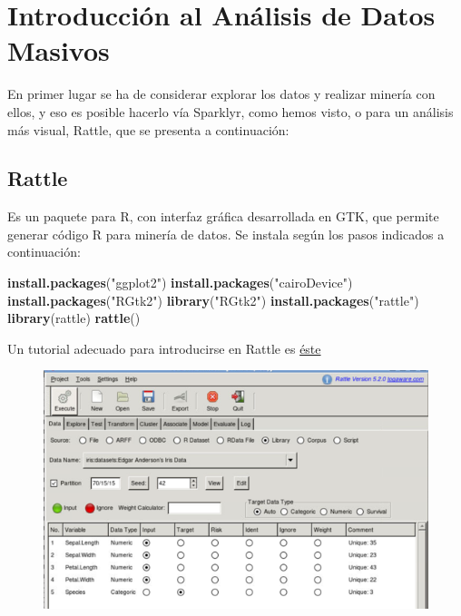 \documentclass[]{book}
\newenvironment{Shaded}{\begin{snugshade}}{\end{snugshade}}
\newcommand{\KeywordTok}[1]{\textcolor[rgb]{0.13,0.29,0.53}{\textbf{#1}}}
\newcommand{\StringTok}[1]{\textcolor[rgb]{0.31,0.60,0.02}{#1}}
\newcommand{\NormalTok}[1]{#1}
\begin{document}
\section{Introducción al Análisis de Datos
Masivos}\label{introduccion-al-analisis-de-datos-masivos}

En primer lugar se ha de considerar explorar los datos y realizar
minería con ellos, y eso es posible hacerlo vía Sparklyr, como hemos
visto, o para un análisis más visual, Rattle, que se presenta a
continuación:

\subsection{Rattle}\label{rattle}

Es un paquete para R, con interfaz gráfica desarrollada en GTK, que
permite generar código R para minería de datos. Se instala según los
pasos indicados a continuación:

\begin{Shaded}
\begin{Highlighting}[]
\KeywordTok{install.packages}\NormalTok{(}\StringTok{"ggplot2"}\NormalTok{)}
\KeywordTok{install.packages}\NormalTok{(}\StringTok{"cairoDevice"}\NormalTok{)}
\KeywordTok{install.packages}\NormalTok{(}\StringTok{"RGtk2"}\NormalTok{)}
\KeywordTok{library}\NormalTok{(}\StringTok{"RGtk2"}\NormalTok{)}
\KeywordTok{install.packages}\NormalTok{(}\StringTok{"rattle"}\NormalTok{)}
\KeywordTok{library}\NormalTok{(rattle)}
\KeywordTok{rattle}\NormalTok{()}
\end{Highlighting}
\end{Shaded}

Un tutorial adecuado para introducirse en Rattle es
\href{https://www.dummies.com/programming/using-rattle-iris-r-programming/}{éste}

\begin{figure}
\centering
\includegraphics{images/T3-rattle1.png}
\caption{}
\end{figure}
\end{document}
